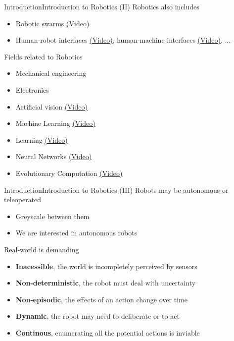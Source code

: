 \documentclass[10pt,compress]{beamer} %
\begin{document}
\begin{frame}{Introduction}{Introduction to Robotics (II)}
	Robotics also includes
	\begin{itemize}
		\item Robotic swarms \href{https://www.youtube.com/watch?v=xK54Bu9HFRw}{(Video)}
		\item Human-robot interfaces \href{https://www.youtube.com/watch?v=Qpn591m6hzU}{(Video)}, human-machine interfaces \href{https://www.youtube.com/watch?v=LJ0sIHj-OWo}{(Video)}, ...
	\end{itemize}

	Fields related to Robotics
	\begin{itemize}
		\item Mechanical engineering
		\item Electronics
		\item Artificial vision \href{https://www.youtube.com/watch?v=4KlYdCBdjEg}{(Video)}
		\item Machine Learning \href{https://www.youtube.com/watch?v=pgaEE27nsQw}{(Video)}
		\item Learning \href{https://www.youtube.com/watch?v=W\_gxLKSsSIE}{(Video)}
		\item Neural Networks \href{https://www.youtube.com/watch?v=xcIBoPuNIiw}{(Video)}
		\item Evolutionary Computation \href{https://www.youtube.com/watch?v=HgWQ-gPIvt4}{(Video)}
	\end{itemize}
\end{frame}

\begin{frame}{Introduction}{Introduction to Robotics (III)}
	Robots may be \alert{autonomous} or \alert{teleoperated}
	\begin{itemize}
		\item Greyscale between them
		\item We are interested in autonomous robots
	\end{itemize}
	Real-world is demanding
	\begin{itemize}
		\item \textbf{Inacessible}, the world is incompletely perceived by sensors
		\item \textbf{Non-deterministic}, the robot must deal with uncertainty
		\item \textbf{Non-episodic}, the effects of an action change over time
		\item \textbf{Dynamic}, the robot may need to deliberate or to act
		\item \textbf{Continous}, enumerating all the potential actions is inviable
	\end{itemize}
\end{frame}
\end{document}
